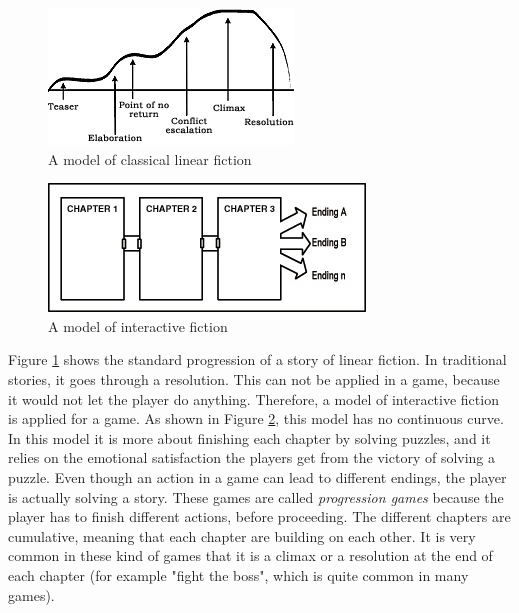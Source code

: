 \begin{figure}
\begin{center}
\includegraphics[scale=1.0]{linearFiction}
\caption[Classical linear fiction]{A model of classical linear fiction \cite{understandingvg}}
\label{fig:linearfiction}
\end{center}
\end{figure} 
\begin{figure}
\begin{center}
\includegraphics[scale=1.0]{interactiveFiction}
\caption[Interactive fiction]{A model of interactive fiction \cite{understandingvg}}
\label{fig:interactivefiction}
\end{center}
\end{figure} 

Figure \ref{fig:linearfiction} shows the standard progression of a story of linear fiction. In traditional stories, it goes through a resolution. This can not be applied in a game, because it would not let the player do anything. Therefore, a model of interactive fiction is applied for a game. As shown in Figure \ref{fig:interactivefiction}, this model has no continuous curve. In this model it is more about finishing each chapter by solving puzzles, and it relies on the emotional satisfaction the players get from the victory of solving a puzzle. Even though an action in a game can lead to different endings, the player is actually solving a story. These games are called \emph{progression games} because the player has to finish different actions, before proceeding. The different chapters are cumulative, meaning that each chapter are building on each other. It is very common in these kind of games that it is a climax or a resolution at the end of each chapter (for example "fight the boss", which is quite common in many games). 

